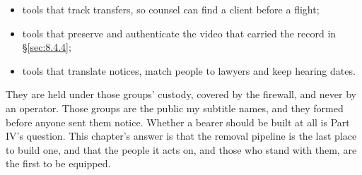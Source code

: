 \begin{itemize}
\item tools that track transfers, so counsel can find a client before a flight;
\item tools that preserve and authenticate the video that carried the record in \S\ref{sec:8.4.4};
\item tools that translate notices, match people to lawyers and keep hearing dates.
\end{itemize}

They are held under those groups' custody, covered by the firewall, and never by an operator. Those groups are the public my subtitle names, and they formed before anyone sent them notice. Whether a bearer should be built at all is Part IV's question. This chapter's answer is that the removal pipeline is the last place to build one, and that the people it acts on, and those who stand with them, are the first to be equipped.
